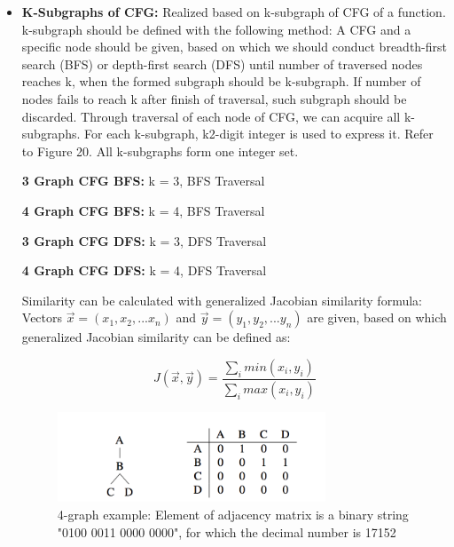 \begin{itemize}
	
	\item \textbf{K-Subgraphs of CFG:} Realized based on k-subgraph of CFG of a function. k-subgraph should be defined with the following method: A CFG and a specific node should be given, based on which we should conduct breadth-first search (BFS) or depth-first search (DFS) until number of traversed nodes reaches k, when the formed subgraph should be k-subgraph. If number of nodes fails to reach k after finish of traversal, such subgraph should be discarded. Through traversal of each node of CFG, we can acquire all k-subgraphs. For each k-subgraph, k2-digit integer is used to express it. Refer to Figure 20. All k-subgraphs form one integer set.
	
	\textbf{3 Graph CFG BFS:} k = 3, BFS Traversal
	
	\textbf{4 Graph CFG BFS:} k = 4, BFS Traversal
	
	\textbf{3 Graph CFG DFS:} k = 3, DFS Traversal
	
	\textbf{4 Graph CFG DFS:} k = 4, DFS Traversal
	
	Similarity can be calculated with generalized Jacobian similarity formula: Vectors $\vec{x}=(x_{1}, x_{2}, ...x_{n})$ and $\vec{y}=(y_{1}, y_{2}, ...y_{n})$ are given, based on which generalized Jacobian similarity can be defined as:
	
	
	\begin{equation}
	J(\vec{x}, \vec{y})=\frac{\sum_imin(x_{i}, y_{i})}{\sum_imax(x_{i}, y_{i})}
	\end{equation}
	
	\begin{figure}[h]
	\centering
	\includegraphics[width=8cm]{./figs/graph-matrix.png}
	\caption{4-graph example: Element of adjacency matrix is a binary string "0100 0011 0000 0000", for which the decimal number is 17152}
	\label{fig:graph-ex}
	\end{figure}


\end{itemize}
